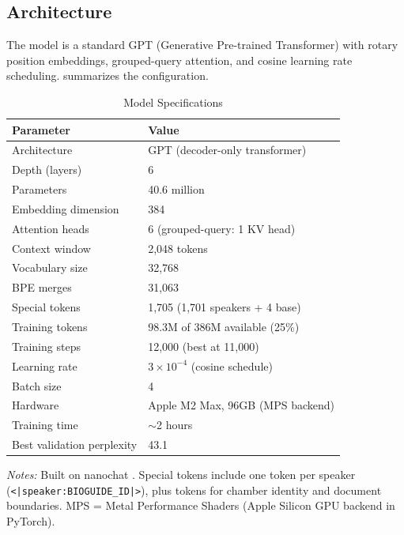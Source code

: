 \documentclass[12pt]{article}
\begin{document}
\subsection{Architecture}

The model is a standard GPT (Generative Pre-trained Transformer) with rotary position embeddings, grouped-query attention, and cosine learning rate scheduling.  summarizes the configuration.

\begin{table}[H]
\centering
\caption{Model Specifications}
\label{tab:model}
\begin{threeparttable}
\begin{tabular}{ll}
\toprule
Parameter & Value \\
\midrule
Architecture & GPT (decoder-only transformer) \\
Depth (layers) & 6 \\
Parameters & 40.6 million \\
Embedding dimension & 384 \\
Attention heads & 6 (grouped-query: 1 KV head) \\
Context window & 2,048 tokens \\
Vocabulary size & 32,768 \\
\quad BPE merges & 31,063 \\
\quad Special tokens & 1,705 (1,701 speakers + 4 base) \\
\midrule
Training tokens & 98.3M of 386M available (25\%) \\
Training steps & 12,000 (best at 11,000) \\
Learning rate & $3 \times 10^{-4}$ (cosine schedule) \\
Batch size & 4 \\
Hardware & Apple M2 Max, 96GB (MPS backend) \\
Training time & $\sim$2 hours \\
Best validation perplexity & 43.1 \\
\bottomrule
\end{tabular}
\begin{tablenotes}[flushleft]
\small
\item \textit{Notes:} Built on nanochat \citep{karpathy2025}. Special tokens include one token per speaker (\texttt{<|speaker:BIOGUIDE\_ID|>}), plus tokens for chamber identity and document boundaries. MPS = Metal Performance Shaders (Apple Silicon GPU backend in PyTorch).
\end{tablenotes}
\end{threeparttable}
\end{table}
\end{document}
